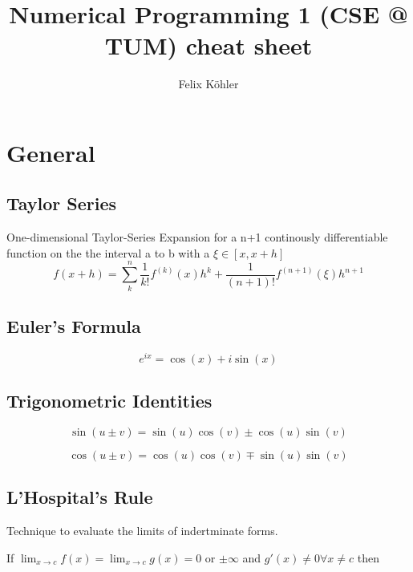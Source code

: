 \documentclass[
    a4paper,
    11pt
]{article}
\author{Felix Köhler}
\title{Numerical Programming 1 (CSE @ TUM) cheat sheet}
\begin{document}
\maketitle

\tableofcontents

\clearpage

\section{General}

\subsection{Taylor Series}

One-dimensional Taylor-Series Expansion for a n+1 continously differentiable
function on the the interval a to b with a $\xi \in [x, x+h]$
\begin{equation}
    f(x+h) = \sum_k^n \frac{1}{k!} f^{(k)}(x)h^k + \frac{1}{(n+1)!}
    f^{(n+1)}(\xi)h^{n+1}
\end{equation}

\subsection{Euler's Formula}

\begin{equation}
    e^{ix} = \cos(x) + i\sin(x)
\end{equation}

\subsection{Trigonometric Identities}

\begin{equation}
    \sin(u \pm v) = \sin(u) \cos(v) \pm \cos(u) \sin(v)
\end{equation}

\begin{equation}
    \cos(u \pm v) = \cos(u) \cos(v) \mp \sin(u) \sin(v)
\end{equation}

\subsection{L'Hospital's Rule}

Technique to evaluate the limits of indertminate forms.

If $\lim_{x\to c} f(x) = \lim_{x\to c}g(x) = 0$ or $\pm \infty$ and $g'(x) \neq 0
\forall x \neq c$ then
\end{document}
